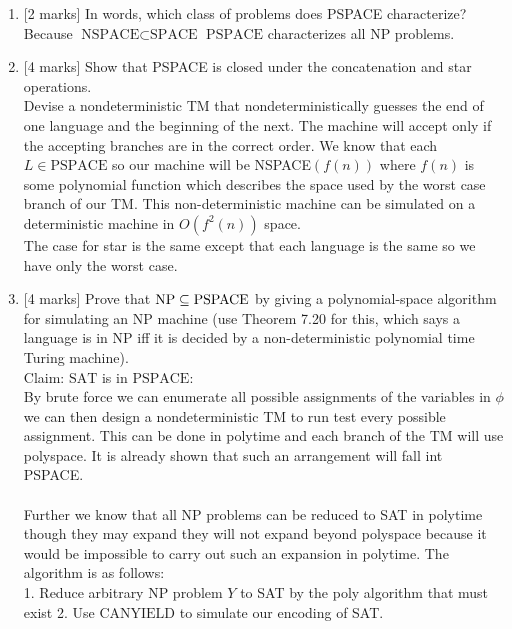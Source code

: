 \documentclass{article}
\newcommand{\class}[1]{\text{#1}}
\begin{document}
\begin{enumerate}
    \item {[2 marks]} In words, which class of problems does PSPACE characterize? \\
    Because $\class{NSPACE} \subset \class{SPACE}$ $\class{PSPACE}$ characterizes all NP problems.
    
    
    \item {[4 marks]} Show that PSPACE is closed under the concatenation and star operations. \\
	Devise a nondeterministic TM that nondeterministically guesses the end of one language and the beginning of the next. The machine will accept only if the accepting branches are in the correct order. We know that each $L \in \class{PSPACE}$ so our machine will be NSPACE$(f(n))$ where $f(n)$ is some polynomial function which describes the space used by the worst case branch of our TM. This non-deterministic machine can be simulated on a deterministic machine in $O(f^2(n))$ space.\\
	
	The case for star is the same except that each language is the same so we have only the worst case. 
    
    
    \item {[4 marks]} Prove that ${\rm NP}\subseteq {\rm PSPACE}$ by giving a polynomial-space algorithm for simulating an NP machine (use Theorem 7.20 for this, which says a language is in NP iff it is decided by a non-deterministic polynomial time Turing machine).\\
    
Claim: $\class{SAT}$ is in $\class{PSPACE}$:\\
By brute force we can enumerate all possible assignments of the variables in $\phi$ we can then design a nondeterministic TM to run test every possible assignment. This can be done in polytime and each branch of the TM will use polyspace. It is already shown that such an arrangement will fall int PSPACE.\\
\\

Further we know that all NP problems can be reduced to SAT in polytime though they may expand they will not expand beyond polyspace because it would be impossible to carry out such an expansion in polytime. The algorithm is as follows: \\
1. Reduce arbitrary NP problem $Y$ to SAT by the poly algorithm that must exist
2. Use $\class{CANYIELD}$ to simulate our encoding of SAT.
    

\end{enumerate}
\end{document}

